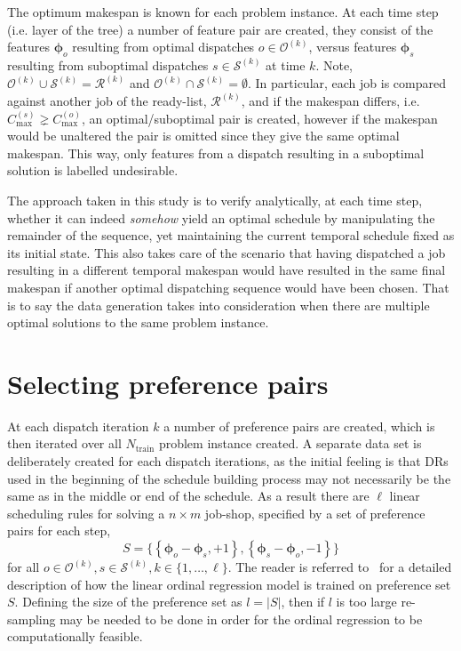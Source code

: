 \documentclass[letterpaper]{article}
\newcommand{\vphi}{{\boldsymbol{\phi}}}
\begin{document}
The optimum makespan is known for each problem instance. 
At each time step (i.e. layer of the tree) a number of feature pair are created, they consist of the features 
$\vphi_o$ resulting from optimal dispatches $o\in\mathcal{O}^{(k)}$, versus features $\vphi_s$ resulting from 
suboptimal dispatches $s\in\mathcal{S}^{(k)}$ at time $k$. Note, 
$\mathcal{O}^{(k)}\cup\mathcal{S}^{(k)}=\mathcal{R}^{(k)}$ and $\mathcal{O}^{(k)}\cap\mathcal{S}^{(k)}=\emptyset$.
In particular, each job is compared against another job of the ready-list, $\mathcal{R}^{(k)}$, and if the makespan differs, i.e. $C_{\max}^{(s)} \gneq C_{\max}^{(o)}$, an optimal/suboptimal pair is created, however if the makespan would be unaltered the pair is omitted since they give the same optimal makespan. This way, only features from a dispatch resulting in a suboptimal solution is labelled undesirable.

The approach taken in this study is to verify analytically, at each time step, whether it can indeed \emph{somehow} yield an optimal schedule by manipulating the remainder of the sequence, yet maintaining the current temporal schedule fixed as its initial state. This also takes care of the scenario that having dispatched a job resulting in a different temporal makespan would have resulted in the same final makespan if another optimal dispatching sequence would have been chosen. That is to say the data generation takes into consideration when there are multiple optimal solutions to the same problem instance. 

\section{Selecting preference pairs}\label{sec:strategy}
At each dispatch iteration $k$ a number of preference pairs are created, which is then iterated over all $N_{\text{train}}$ problem instance created. A separate data set is deliberately created for each dispatch iterations, as the initial feeling is that DRs used in the beginning of the schedule building process may not necessarily be the same as in the middle or end of the schedule. As a result there are $\ell$ linear scheduling rules for solving a $n \times m$ job-shop, specified by a set of preference pairs for each step,  
\begin{equation}
S = \big\{\left\{\vphi_o-\vphi_s,+1\right\},\left\{\vphi_s-\vphi_o,-1\right\}\big\}\label{eq:Sjssp}
\end{equation}
for all $o\in \mathcal{O}^{(k)},s\in \mathcal{S}^{(k)}, k\in\{1,\ldots,\ell\}$.
The reader is referred to~\cite{InRu11a} for a detailed description of how the linear ordinal regression model is trained on preference set $S$. Defining the size of the preference set as $l=\left|S\right|$, then if  $l$ is too large re-sampling may be needed to be done in order for the ordinal regression to be computationally feasible. 
\end{document}
